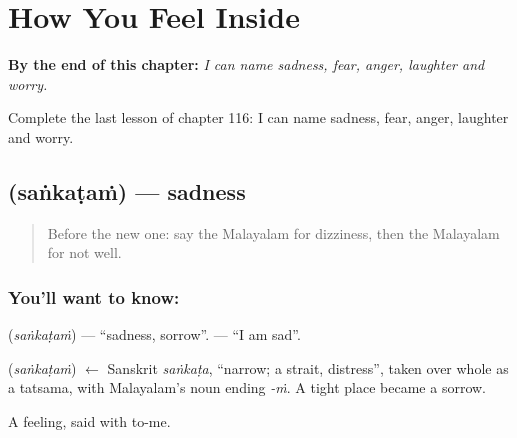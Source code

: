 
\chapter{How You Feel Inside}
\label{ch:ml-how-you-feel-inside}

\begin{chapteropening}
\textbf{By the end of this chapter:} \emph{I can name sadness, fear, anger, laughter and worry.}

Complete the last lesson of chapter 116: I can name sadness, fear, anger, laughter and worry.
\end{chapteropening}

\section[\texorpdfstring{\ml{സങ്കടം} (saṅkaṭaṁ)}{സങ്കടം (saṅkaṭaṁ)}]{ (saṅkaṭaṁ) — sadness}

\label{lesson:ML-C116-sadness}



\begin{quote}
Before the new one: say the Malayalam for dizziness, then the Malayalam for not well.
\end{quote}

\subsection*{You'll want to know: }
\textbf{} (\emph{saṅkaṭaṁ}) — \textquotedblleft{}sadness, sorrow\textquotedblright{}. \textbf{ } — \textquotedblleft{}I am sad\textquotedblright{}.

\begin{cousinweb}
\textbf{} (\emph{saṅkaṭaṁ}) $\leftarrow$ Sanskrit \emph{saṅkaṭa}, \textquotedblleft{}narrow; a strait, distress\textquotedblright{}, taken over whole as a tatsama, with Malayalam's noun ending \emph{-ṁ}. A tight place became a sorrow.
\end{cousinweb}

\begin{grammarlens}[title={What you've built}]
A feeling, said with to-me.
\end{grammarlens}

